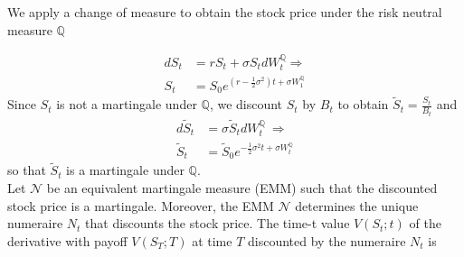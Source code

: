 \documentclass[a4 paper, 12pt]{report}
\theoremstyle{plain}
\begin{document}
%
%
%
%
%
%
%
%
%
%
%
%
%




We apply a change of measure to obtain the stock price under the risk neutral measure $\mathbb{Q}$

\begin{equation}\label{7}
\begin{split}
dS_t& = rS_t+\sigma S_tdW_t^{\mathbb{Q}}\Rightarrow\\
S_t& = S_0e^{(r-\frac{1}{2}\sigma^2)t+\sigma W_1^{\mathbb{Q}}}
\end{split}
\end{equation}
Since $S_t$ is not a martingale under $\mathbb{Q}$, we discount $S_t$ by $B_t$ to obtain $\tilde{S}_t = \frac{S_t}{B_t}$ and
\begin{align*}
d\tilde{S}_t& = \sigma\tilde{S}_tdW_t^{\mathbb{Q}}~\Rightarrow\\
\tilde{S}_t& = \tilde{S}_{0}e^{-\frac{1}{2}\sigma^2t+\sigma W_t^{\mathbb{Q}}}
\end{align*}
so that $\tilde{S}_t$ is a martingale under $\mathbb{Q}$.\\%

Let $\mathcal{N}$ be an equivalent martingale measure (EMM) such that the discounted stock price is a martingale. Moreover, the EMM $\mathcal{N}$ determines the unique numeraire $N_t$ that discounts the stock price. The time-t value $V(S_t;t)$ of the derivative with payoff $V(S_T ; T)$ at time $T$ discounted by the numeraire $N_t$ is
\end{document}
